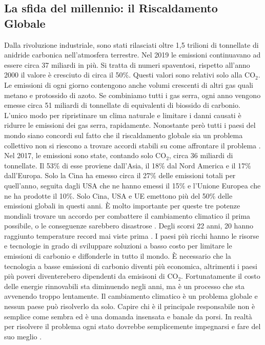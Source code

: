 \subsection{La sfida del millennio: il Riscaldamento Globale}
\noindent Dalla rivoluzione industriale, sono stati rilasciati oltre 1,5 trilioni di tonnellate di anidride carbonica nell'atmosfera terrestre. 
Nel 2019 le emissioni continuavano ad essere circa 37 miliardi in più. 
Si tratta di numeri spaventosi, rispetto all'anno 2000 il valore è cresciuto di circa il 50\%.\newline
Questi valori sono relativi solo alla CO$_2$. Le emissioni di ogni giorno contengono anche volumi crescenti di altri gas quali metano e protossido di azoto. Se combiniamo tutti i gas serra, ogni anno vengono emesse circa 51 miliardi di tonnellate di equivalenti di biossido di carbonio.\newline
L'unico modo per ripristinare un clima naturale e limitare i danni causati è ridurre le emissioni dei gas serra, rapidamente.\newline
Nonostante però tutti i paesi del mondo siano concordi sul fatto che il riscaldamento globale sia un problema collettivo non si riescono a trovare accordi stabili su come affrontare il problema \cite{whosResponsible}.\newline
Nel 2017, le emissioni sono state, contando solo CO$_2$, circa 36 miliardi di tonnellate. Il 53\% di esse proviene dall'Asia, il 18\% dal Nord America e il 17\% dall'Europa. Solo la Cina ha emesso circa il 27\% delle emissioni totali per quell'anno, seguita dagli USA che ne hanno emessi il 15\% e l'Unione Europea che ne ha prodotte il 10\%.\newline
Solo Cina, USA e UE emettono più del 50\% delle emissioni globali in questi anni. È molto importante per queste tre potenze mondiali trovare un accordo per combattere il cambiamento climatico il prima possibile, o le conseguenze sarebbero disastrose \cite{co2Green}.
Degli scorsi 22 anni, 20 hanno raggiunto temperature record mai viste prima \cite{wmo}.
I paesi più ricchi hanno le risorse e tecnologie in grado di sviluppare soluzioni a basso costo per limitare le emissioni di carbonio e diffonderle in tutto il mondo.
È necessario che la tecnologia a basse emissioni di carbonio diventi più economica, altrimenti i paesi più poveri diventerebero dipendenti da emisisoni di CO$_2$.
Fortunatamente il costo delle energie rinnovabili sta diminuendo negli anni, ma è un processo che sta avvenendo troppo lentamente. \newline
Il cambiamento climatico è un problema globale e nessun paese può risolverlo da solo.\newline
Capire chi è il principale responsabile non è semplice come sembra ed è una domanda insensata e banale da porsi.
In realtà per risolvere il problema ogni stato dovrebbe semplicemente impegnarsi e fare del suo meglio \cite{whosResponsible}.

